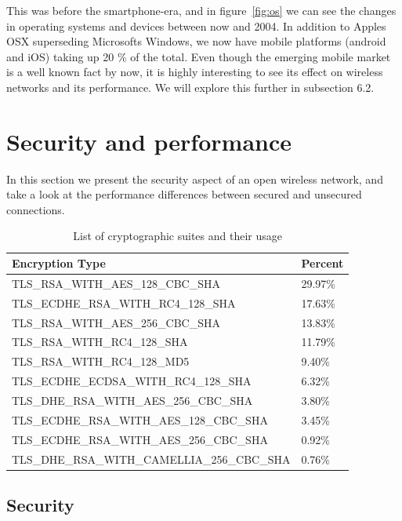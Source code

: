 \documentclass[letterpaper,twocolumn,10pt]{article}
\begin{document}
This was before the smartphone-era, and in figure~\ref{fig:os} we can see the changes in operating systems and devices between now and 2004. In addition to Apples OSX superseding Microsofts Windows, we now have mobile platforms (android and iOS) taking up 20 \% of the total. Even though the emerging mobile market is a well known fact by now, it is highly interesting to see its effect on wireless networks and its performance. We will explore this further in subsection 6.2.

\section{Security and performance}

In this section we present the security aspect of an open wireless network, and take a look at the performance differences between secured and unsecured connections.

\begin{table}
\footnotesize
    \begin{tabular}{|p{6.3cm}|l|}
    \hline
     			{\bf Encryption Type}                      &  			{\bf Percent} \\ \hline
     			TLS\_RSA\_WITH\_AES\_128\_CBC\_SHA    &  			29.97\% \\ \hline
     			TLS\_ECDHE\_RSA\_WITH\_RC4\_128\_SHA  &  			17.63\% \\ \hline
     			TLS\_RSA\_WITH\_AES\_256\_CBC\_SHA    &  			13.83\% \\ \hline
     			TLS\_RSA\_WITH\_RC4\_128\_SHA         &  			11.79\% \\ \hline
     			TLS\_RSA\_WITH\_RC4\_128\_MD5         &  			9.40\%  \\ \hline
     			TLS\_ECDHE\_ECDSA\_WITH\_RC4\_128\_SHA &  			6.32\%  \\ \hline
     			TLS\_DHE\_RSA\_WITH\_AES\_256\_CBC\_SHA &  			3.80\%  \\ \hline
     			TLS\_ECDHE\_RSA\_WITH\_AES\_128\_CBC\_SHA &  			3.45\%  \\ \hline
     			TLS\_ECDHE\_RSA\_WITH\_AES\_256\_CBC\_SHA &  			0.92\%  \\ \hline
     			TLS\_DHE\_RSA\_WITH\_CAMELLIA\_256\_CBC\_SHA &  			0.76\%  \\ \hline
    \end{tabular}
    \caption{List of cryptographic suites and their usage}
    \label{tab:encryptions}
\end{table}

\subsection{Security}
\end{document}

